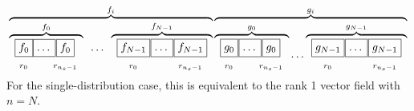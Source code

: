 \[
\overbrace{
\overbrace{
\begin{array}{cc} \boxed{f_0} \\  _{r_0} \end{array} \mkern-18mu
\begin{array}{cc} \boxed{\ldots\vphantom{f_0}} \\ \phantom{r_2}\end{array} \mkern-22mu
\begin{array}{cc} \boxed{f_0} \\  _{r_{n_s-1}} \end{array}
}^{f_0}
\begin{array}{cc} \ldots \\ \phantom{r_2} \end{array}
\overbrace{
\begin{array}{cc} \boxed{f_{N-1}} \\  _{r_0} \end{array} \mkern-17mu
\begin{array}{cc} \boxed{\ldots\vphantom{f_{N-1}}} \\ \phantom{r_2}\end{array} \mkern-17mu
\begin{array}{cc} \boxed{f_{N-1}} \\  _{r_{n_s-1}} \end{array}
}^{f_{N-1}}
}^{f_i}
\overbrace{
\overbrace{
\begin{array}{cc} \boxed{g_0\vphantom{f_{N-1}}} \\ _{r_0} \end{array} \mkern-17mu
\begin{array}{cc} \boxed{\ldots\vphantom{f_{N-1}}} \\ \phantom{r_2}\end{array} \mkern-22mu
\begin{array}{cc} \boxed{g_0\vphantom{f_{N-1}}} \\  _{r_{n_s-1}} \end{array}
}^{g_0} \ldots
\overbrace{
\begin{array}{cc} \boxed{g_{N-1}\vphantom{f_{N-1}}} \\ _{r_0} \end{array} \mkern-17mu
\begin{array}{cc} \boxed{\ldots\vphantom{f_{N-1}}} \\ \phantom{r_2}\end{array} \mkern-17mu
\begin{array}{cc} \boxed{g_{N-1}\vphantom{f_{N-1}}} \\  _{r_{n_s-1}} \end{array}
}^{g_{N-1}\vphantom{f_{N-1}}}
}^{g_i} 
\]
For the single-distribution case, this is equivalent to the rank 1 vector
field with $n=N$.

\vfill
\pagebreak

